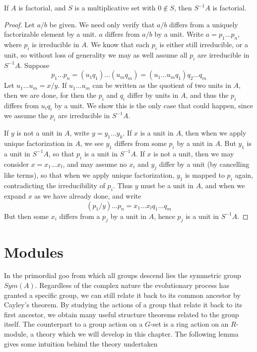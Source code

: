 \begin{theorem}
    If $A$ is factorial, and $S$ is a multiplicative set with $0 \not \in S$, then $S^{-1}A$ is factorial.
\end{theorem}
\begin{proof}
    Let $a/b$ be given. We need only verify that $a/b$ differs from a uniquely factorizable element by a unit. $a$ differs from $a/b$ by a unit. Write $a = p_1 \dots p_n$, where $p_i$ is irreducible in $A$. We know that each $p_i$ is either still irreducible, or a unit, so without loss of generality we may as well assume all $p_i$ are irreducible in $S^{-1}A$. Suppose
    \[ p_1 \dots p_n = (u_1 q_1) \dots (u_m q_m) = (u_1 \dots u_m q_1) q_2 \dots q_m \]
    Let $u_1 \dots u_m = x/y$. If $u_1 \dots u_m$ can be written as the quotient of two units in $A$, then we are done, for then the $p_i$ and $q_i$ differ by units in $A$, and thus the $p_i$ differs from $u_i q_i$ by a unit. We show this is the only case that could happen, since we assume the $p_i$ are irreducible in $S^{-1}A$.

    If $y$ is not a unit in $A$, write $y = y_1 \dots y_k$. If $x$ is a unit in $A$, then when we apply unique factorization in $A$, we see $y_1$ differs from some $p_i$ by a unit in $A$. But $y_1$ is a unit in $S^{-1}A$, so that $p_i$ is a unit in $S^{-1}A$. If $x$ is not a unit, then we may consider $x = x_1 \dots x_{l}$, and may assume no $x_i$ and $y_j$ differ by a unit (by cancelling like terms), so that when we apply unique factorization, $y_1$ is mapped to $p_i$ again, contradicting the irreducibility of $p_i$. Thus $y$ must be a unit in $A$, and when we expand $x$ as we have already done, and write
    \[ (p_1/y) \dots p_n = x_1 \dots x_{l} q_1 \dots q_m \]
    But then some $x_i$ differs from a $p_j$ by a unit in $A$, hence $p_j$ is a unit in $S^{-1}A$.
\end{proof}




\chapter{Modules}

In the primordial goo from which all groups descend lies the symmetric group $Sym(A)$. Regardless of the complex nature the evolutionary process has granted a specific group, we can still relate it back to its common ancestor by Cayley's theorem. By studying the actions of a group that relate it back to its first ancestor, we obtain many useful structure theorems related to the group itself. The counterpart to a group action on a $G$-set is a ring action on an $R$-module, a theory which we will develop in this chapter. The following lemma gives some intuition behind the theory undertaken

